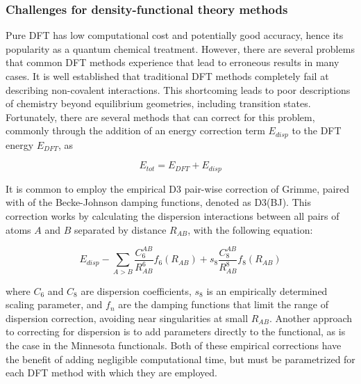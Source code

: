 \begin{doublespace}
\subsubsection{Challenges for density-functional theory methods}

Pure DFT has low computational cost and potentially good accuracy, hence its
popularity as a quantum chemical treatment. However, there are several problems
that common DFT methods experience that lead to erroneous results in many
cases.\cite{Cohen2012} It is well established that traditional DFT methods
completely fail at describing non-covalent
interactions.\cite{DiLabio2016,OterodelaRoza2017} This shortcoming leads to
poor descriptions of chemistry beyond equilibrium geometries, including
transition states. Fortunately, there are several methods that can correct for
this problem, commonly through the addition of an energy correction term
$E_{disp}$ to the DFT energy $E_{DFT}$, as

\begin{equation}
  E_{tot} = E_{DFT} + E_{disp}
\end{equation}

\noindent It is common to employ the empirical D3 pair-wise correction of
Grimme,\cite{Grimme2010} paired with of the Becke-Johnson damping
functions,\cite{Johnson2006} denoted as D3(BJ). This correction works by
calculating the dispersion interactions between all pairs of atoms $A$ and $B$
separated by distance $R_{AB}$, with the following equation:

\begin{equation}
  E_{disp} - \sum_{A>B} \frac{C_6^{AB}}{R_{AB}^6} f_6(R_{AB}) + s_8
  \frac{C_8^{AB}}{R_{AB}^8} f_8(R_{AB})
\end{equation}

\noindent where $C_6$ and $C_8$ are dispersion coefficients, $s_8$ is an
empirically determined scaling parameter, and $f_n$ are the damping functions
that limit the range of dispersion correction, avoiding near singularities at
small $R_{AB}$. Another approach to correcting for dispersion is to add
parameters directly to the functional, as is the case in the Minnesota
functionals.\cite{Zhao2006,Zhao2006} Both of these empirical corrections have
the benefit of adding negligible computational time, but must be parametrized
for each DFT method with which they are employed.


\end{doublespace}
